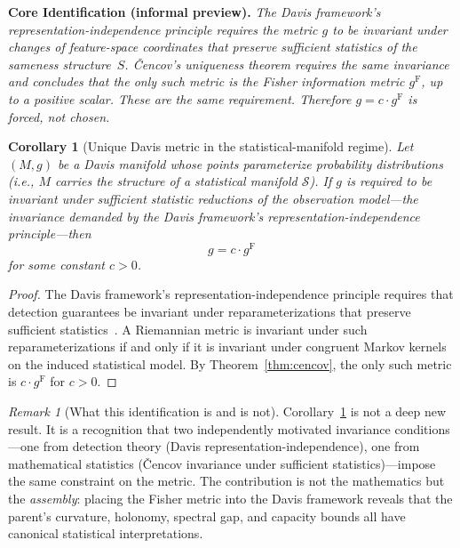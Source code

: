 \documentclass[11pt]{article}
\newcommand{\gF}{g^{\mathrm{F}}}
\newtheorem{corollary}{Corollary}
\theoremstyle{remark}
\newtheorem{remark}{Remark}
\begin{document}
\begin{mdframed}[backgroundcolor=gray!10, linewidth=0.4pt]
\noindent\textbf{Core Identification (informal preview).}
\emph{The Davis framework's representation-independence principle requires the
metric $g$ to be invariant under changes of feature-space coordinates that
preserve sufficient statistics of the sameness structure~$S$.  \v{C}encov's
uniqueness theorem requires the same invariance and concludes that the only
such metric is the Fisher information metric $\gF$, up to a positive scalar.
These are the same requirement.  Therefore $g = c \cdot \gF$ is forced, not
chosen.}
\end{mdframed}
\vspace{1ex}

\begin{corollary}[Unique Davis metric in the statistical-manifold regime]\label{cor:canonical-davis}
Let $(M, g)$ be a Davis manifold whose points parameterize probability
distributions (i.e., $M$ carries the structure of a statistical manifold
$\mathcal{S}$).  If $g$ is required to be invariant under sufficient statistic
reductions of the observation model---the invariance demanded by the Davis
framework's representation-independence principle---then
\[
g = c \cdot \gF
\]
for some constant $c > 0$.
\end{corollary}

\begin{proof}
The Davis framework's representation-independence principle requires that
detection guarantees be invariant under reparameterizations that preserve
sufficient statistics~\cite{davis2025manifold, davis2025sameness}.  A
Riemannian metric is invariant under such reparameterizations if and only if it
is invariant under congruent Markov kernels on the induced statistical model.
By Theorem~\ref{thm:cencov}, the only such metric is $c \cdot \gF$ for
$c > 0$.
\end{proof}

\begin{remark}[What this identification is and is not]
\label{rmk:identification}
Corollary~\ref{cor:canonical-davis} is not a deep new result.  It is a
recognition that two independently motivated invariance conditions---one from
detection theory (Davis representation-independence), one from mathematical
statistics (\v{C}encov invariance under sufficient statistics)---impose the
same constraint on the metric.  The contribution is not the mathematics but the
\emph{assembly}: placing the Fisher metric into the Davis framework reveals
that the parent's curvature, holonomy, spectral gap, and capacity bounds all
have canonical statistical interpretations.
\end{remark}
\end{document}
